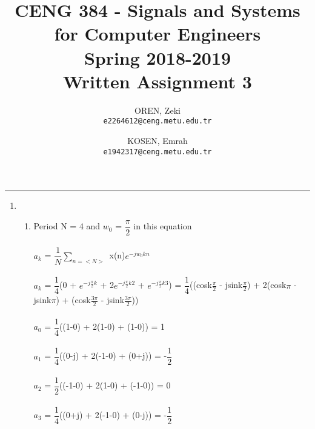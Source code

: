 \documentclass[10pt,a4paper, margin=1in]{article}
\author{
  OREN, Zeki\\
  \texttt{e2264612@ceng.metu.edu.tr}
  \and
  KOSEN, Emrah\\
  \texttt{e1942317@ceng.metu.edu.tr}
}
\title{CENG 384 - Signals and Systems for Computer Engineers \\
Spring 2018-2019 \\
Written Assignment 3}
\begin{document}
\maketitle



\noindent\rule{19cm}{1.2pt}

\begin{enumerate}

\item 
    \begin{enumerate}
    \item %
    Period N = 4 and $w_{0}$ = $\dfrac{\pi}{2}$ in this equation\\\\
    $a_{k}$ = $\dfrac{1}{N}\sum_{n=<N>}^{}$ x(n)$e^{-jw_{0}kn}$\\\\
    $a_{k}$ = $\dfrac{1}{4}$(0 + $e^{-j\frac{\pi}{2}k}$ + 2$e^{-j\frac{\pi}{2}k2}$ + $e^{-j\frac{\pi}{2}k3}$) = $\dfrac{1}{4}$((cosk$\frac{\pi}{2}$ - jsink$\frac{\pi}{2}$) + 2(cosk$\pi$ - jsink$\pi$) + (cosk$\frac{3\pi}{2}$ - jsink$\frac{3\pi}{2}$))\\\\
    $a_{0}$ = $\dfrac{1}{4}$((1-0) + 2(1-0) + (1-0)) = 1\\\\
    $a_{1}$ = $\dfrac{1}{4}$((0-j) + 2(-1-0) + (0+j)) = -$\dfrac{1}{2}$\\\\
    $a_{2}$ = $\dfrac{1}{2}$((-1-0) + 2(1-0) + (-1-0)) = 0\\\\
    $a_{3}$ = $\dfrac{1}{4}$((0+j) + 2(-1-0) + (0-j)) = -$\dfrac{1}{2}$\\\\
    \begin{figure} [h!]
    \centering
\end{figure}
\end{enumerate}
\end{enumerate}
\end{document}
